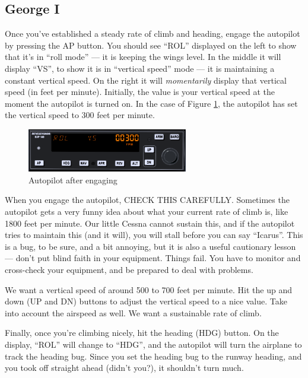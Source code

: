 \subsection{George I}

Once you've established a steady rate of climb and heading, engage the
autopilot by pressing the AP button.  You should see ``ROL'' displayed
on the left to show that it's in ``roll mode'' --- it is keeping the
wings level.  In the middle it will display ``VS'', to show it is in
``vertical speed'' mode --- it is maintaining a constant vertical
speed.  On the right it will \emph{momentarily} display that vertical
speed (in feet per minute).  Initially, the value is your vertical
speed at the moment the autopilot is turned on.  In the case of
Figure \ref{fig:ap_vs}, the autopilot has set the vertical speed to
300 feet per minute.

\begin{figure}
  \begin{center}
    \includegraphics[width=7cm]{img/ap_vs}
    \caption{Autopilot after engaging}
    \label{fig:ap_vs}
  \end{center}
\end{figure}


When you engage the autopilot, CHECK THIS CAREFULLY.  Sometimes the
autopilot gets a very funny idea about what your current rate of climb
is, like 1800 feet per minute.  Our little Cessna cannot sustain this,
and if the autopilot tries to maintain this (and it will), you will
stall before you can say ``Icarus''.  This is a bug, to be sure, and a
bit annoying, but it is also a useful cautionary lesson --- don't put
blind faith in your equipment.  Things fail.  You have to monitor and
cross-check your equipment, and be prepared to deal with problems.

We want a vertical speed of around 500 to 700 feet per minute.  Hit
the up and down (UP and DN) buttons to adjust the vertical speed to a
nice value.  Take into account the airspeed as well.  We want a
sustainable rate of climb.

Finally, once you're climbing nicely, hit the heading (HDG) button.
On the display, ``ROL'' will change to ``HDG'', and the autopilot will
turn the airplane to track the heading bug.  Since you set the heading
bug to the runway heading, and you took off straight ahead (didn't
you?), it shouldn't turn much.

